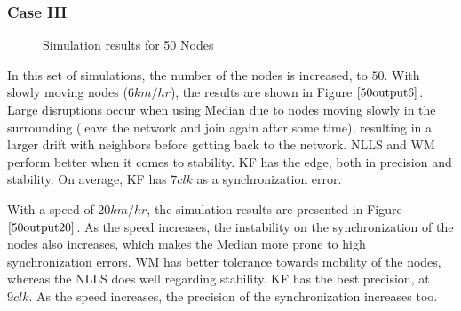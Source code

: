 \documentclass[journal]{IEEEtran}
\begin{document}
\subsubsection{\textbf{Case III}}
\begin{figure}
\centerline{  \hfil {}} \caption{Simulation results for 50 Nodes}
\label{50output}
\end{figure}
In this set of simulations, the number of the nodes is increased, to
$50$. With slowly moving nodes ($6km/hr$), the results are shown in
Figure $\ref{50output6}$. Large disruptions occur when using Median
due to nodes moving slowly in the surrounding (leave the network and
join again after some time), resulting in a larger drift with
neighbors before getting back to the network. NLLS and WM perform
better when it comes to stability. KF has the edge, both in
precision and stability. On average, KF has $7clk$ as a
synchronization error.
\par
With a speed of $20km/hr$, the simulation results are presented in
Figure $\ref{50output20}$. As the speed increases, the instability
on the synchronization of the nodes also increases, which makes the
Median more prone to high synchronization errors. WM has better
tolerance towards mobility of the nodes, whereas the NLLS does well
regarding stability. KF has the best precision, at $9clk$. As the
speed increases, the precision of the synchronization increases too.
\par
\end{document}
